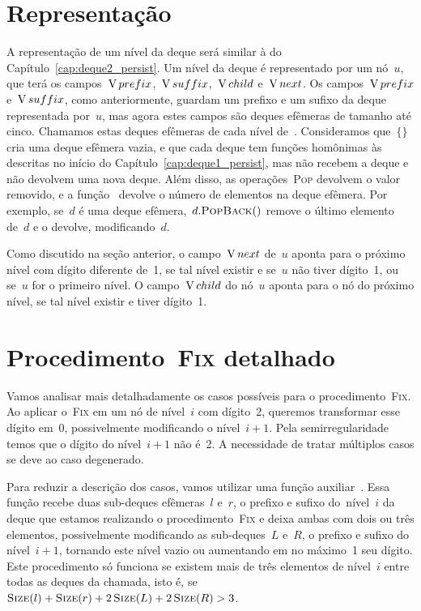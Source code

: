 \documentclass[main.tex]{subfiles}
\begin{document}
\section{Representação}

A representação de um nível da deque será similar à do Capítulo~\ref{cap:deque2_persist}. Um nível da deque é representado por um nó~$u$, que terá os campos~$\operatorname{V}{prefix}$,~$\operatorname{V}{suffix}$,~$\operatorname{V}{child}$ e~$\operatorname{V}{next}$.
Os campos~$\operatorname{V}{prefix}$ e~$\operatorname{V}{suffix}$, como anteriormente, guardam um prefixo e um sufixo da deque representada por~$u$, mas agora estes campos são deques efêmeras de tamanho até cinco. Chamamos estas deques efêmeras de cada nível de~. Consideramos que~$\{\}$ cria uma deque efêmera vazia, e que cada deque tem funções homônimas às descritas no início do Capítulo~\ref{cap:deque1_persist}, mas não recebem a deque e não devolvem uma nova deque. Além disso, as operações~\textsc{Pop} devolvem o valor removido, e a função~ devolve o número de elementos na deque efêmera. Por exemplo, se~$d$ é uma deque efêmera,~$d.\mbox{\textsc{PopBack}\ensuremath{()}}$ remove o último elemento de~$d$ e o devolve, modificando~$d$.

Como discutido na seção anterior, o campo~$\operatorname{V}{next}$ de~$u$ aponta para o próximo nível com dígito diferente de~1, se tal nível existir e se~$u$ não tiver dígito~1, ou se~$u$ for o primeiro nível. O campo~$\operatorname{V}{child}$ do nó~$u$ aponta para o nó do próximo nível, se tal nível existir e tiver dígito~1.

\section{Procedimento~{\normalfont \textsc{Fix}} detalhado} \label{sec:fix_det}

Vamos analisar mais detalhadamente os casos possíveis para o procedimento~\textsc{Fix}. Ao aplicar o~\textsc{Fix} em um nó de nível~$i$ com dígito~2, queremos transformar esse dígito em~0, possivelmente modificando o nível~$i+1$. Pela semirregularidade temos que o dígito do nível~${i+1}$ não é~2. A necessidade de tratar múltiplos casos se deve ao caso degenerado.

Para reduzir a descrição dos casos, vamos utilizar uma função auxiliar~. Essa função recebe duas sub-deques efêmeras~$l$ e~$r$, o prefixo e sufixo do~nível~$i$ da deque que estamos realizando o procedimento~\textsc{Fix} e deixa ambas com dois ou três elementos, possivelmente modificando as sub-deques~$L$ e~$R$, o prefixo e sufixo do nível~${i+1}$, tornando este nível vazio ou aumentando em no máximo~1 seu dígito. Este procedimento só funciona se existem mais de três elementos de nível~$i$ entre todas as deques da chamada, isto é, se~${\Call{Size}{l} + \Call{Size}{r} + 2\,\Call{Size}{L} + 2\,\Call{Size}{R} > 3}$.
\end{document}
